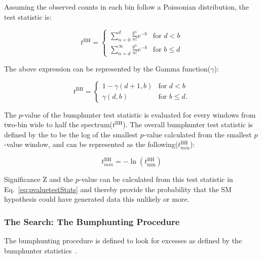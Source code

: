     Assuming the observed counts in each bin follow a Poissonian distribution, the test statistic is:

\begin{equation}
    t^{\textrm{BH}}=
    \begin{cases} \sum_{n=0}^{d} \frac{b^{n}}{n!} e^{-b} &  \textrm{for $d < b$}
    \\
    \sum_{n=d}^{\infty} \frac{b^n}{n!} e^{-b} &  \textrm{for $b \leq d$}
    \end{cases}
\end{equation}

    The above expression can be represented by the Gamma function($\gamma$): 

\begin{equation}
    t^{\textrm{BH}}=
    \begin{cases} 1-\gamma(d+1, b) &  \textrm{for $d < b$}
    \\
    \gamma(d,b) &  \textrm{for $b \leq d$}.
    \end{cases}
\end{equation}
    

    The $p$-value of the bumphunter test statistic is evaluated for every windows from two-bin wide to half the spectrum($t^{\textrm{BH}}$). The overall bumphunter test statistic is defined by the to be the log of the smallest $p$-value calculated from the smallest $p$-value window, and can be represented as the following($t_{min}^{\textrm{BH}}$):

    \begin{equation}
        t_{min}^{\textrm{BH}} = - \ln(t^{\textrm{BH}}_{\textrm{min}}) 
    \end{equation}

    Significance Z and the $p$-value can be calculated from this test statistic in Eq.~\ref{eq:pvaluetestStats} and thereby provide the probability that the SM hypothesis could have generated data this unlikely or more. %


    \subsubsection{The Search: The Bumphunting Procedure}
    The bumphunting procedure is defined to look for excesses as defined by the bumphunter statistics~\cite{Pachal:2063032}.

